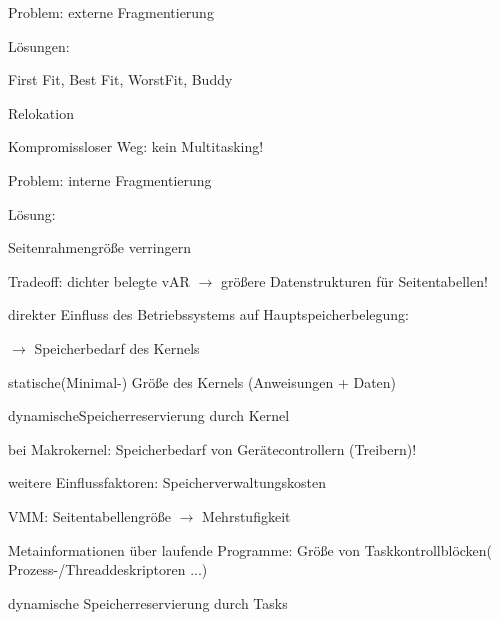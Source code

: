 \documentclass[a4paper]{article}
\begin{document}
\begin{multicols}{3}
    Problem: externe Fragmentierung

    \begin{itemize*}
        \item
        \item
        Lösungen:
        \begin{itemize*}
            \item First Fit, Best Fit, WorstFit, Buddy
            \item Relokation
        \end{itemize*}
        \item
        Kompromissloser Weg: kein Multitasking!
    \end{itemize*}

    Problem: interne Fragmentierung

    \begin{itemize*}
        \item
        \item
        Lösung:
        \begin{itemize*}
            \item Seitenrahmengröße verringern
            \item Tradeoff: dichter belegte vAR $\rightarrow$  größere Datenstrukturen für Seitentabellen!
        \end{itemize*}
        \item
        direkter Einfluss des Betriebssystems auf Hauptspeicherbelegung:
        \begin{itemize*}
            \item $\rightarrow$  Speicherbedarf des Kernels
            \item statische(Minimal-) Größe des Kernels (Anweisungen + Daten)
            \item dynamischeSpeicherreservierung durch Kernel
            \item bei Makrokernel: Speicherbedarf von Gerätecontrollern (Treibern)!
        \end{itemize*}
    \end{itemize*}

    weitere Einflussfaktoren: Speicherverwaltungskosten

    \begin{itemize*}
        \item
        VMM: Seitentabellengröße $\rightarrow$  Mehrstufigkeit
        \item
        Metainformationen über laufende Programme: Größe von
        Taskkontrollblöcken( Prozess-/Threaddeskriptoren ...)
        \item
        dynamische Speicherreservierung durch Tasks
    \end{itemize*}



\end{multicols}
\end{document}
